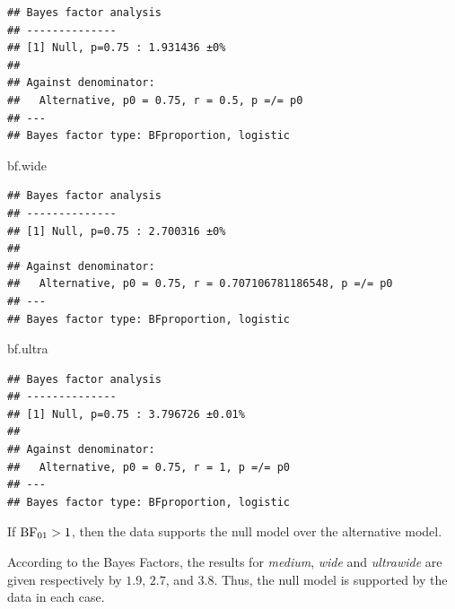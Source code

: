 \documentclass[
]{article}
\newenvironment{Shaded}{\begin{snugshade}}{\end{snugshade}}
\newcommand{\NormalTok}[1]{#1}
\begin{document}
\begin{verbatim}
## Bayes factor analysis
## --------------
## [1] Null, p=0.75 : 1.931436 ±0%
## 
## Against denominator:
##   Alternative, p0 = 0.75, r = 0.5, p =/= p0 
## ---
## Bayes factor type: BFproportion, logistic
\end{verbatim}

\begin{Shaded}
\begin{Highlighting}[]
\NormalTok{bf.wide}
\end{Highlighting}
\end{Shaded}

\begin{verbatim}
## Bayes factor analysis
## --------------
## [1] Null, p=0.75 : 2.700316 ±0%
## 
## Against denominator:
##   Alternative, p0 = 0.75, r = 0.707106781186548, p =/= p0 
## ---
## Bayes factor type: BFproportion, logistic
\end{verbatim}

\begin{Shaded}
\begin{Highlighting}[]
\NormalTok{bf.ultra}
\end{Highlighting}
\end{Shaded}

\begin{verbatim}
## Bayes factor analysis
## --------------
## [1] Null, p=0.75 : 3.796726 ±0.01%
## 
## Against denominator:
##   Alternative, p0 = 0.75, r = 1, p =/= p0 
## ---
## Bayes factor type: BFproportion, logistic
\end{verbatim}

If \(\rm{BF}_{0 1} > 1\), then the data supports the null model over the
alternative model.

According to the Bayes Factors, the results for \emph{medium},
\emph{wide} and \emph{ultrawide} are given respectively by \(1.9\),
\(2.7\), and \(3.8\). Thus, the null model is supported by the data in
each case.
\end{document}
